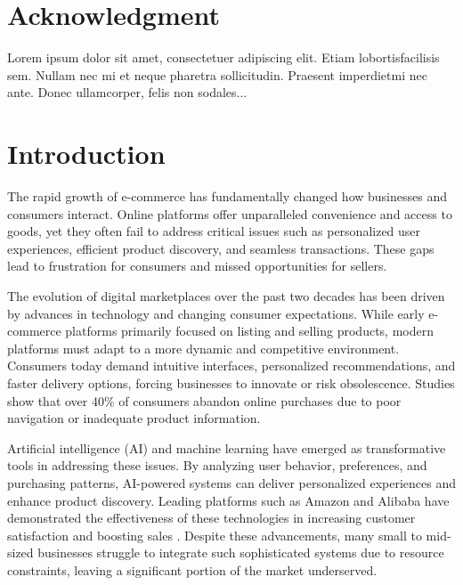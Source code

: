 \documentclass[12pt]{report}
\begin{document}

\chapter*{Acknowledgment}

Lorem  ipsum  dolor  sit  amet,  consectetuer  adipiscing
elit. Etiam  lobortisfacilisis sem.  Nullam nec mi et
neque pharetra sollicitudin.  Praesent imperdietmi nec ante.
Donec ullamcorper, felis non sodales...
\newpage

\tableofcontents

\listoffigures
{}

\listoftables
{}

\clearpage
{}

\newpage

\chapter{Introduction}
The rapid growth of e-commerce has fundamentally changed how businesses and consumers
interact. Online platforms offer unparalleled convenience and access to goods, yet they often
fail to address critical issues such as personalized user experiences, efficient product
discovery, and seamless transactions. These gaps lead to frustration for consumers and missed
opportunities for sellers.

The evolution of digital marketplaces over the past two decades has been driven by advances
in technology and changing consumer expectations. While early e-commerce platforms
primarily focused on listing and selling products, modern platforms must adapt to a more
dynamic and competitive environment. Consumers today demand intuitive interfaces,
personalized recommendations, and faster delivery options, forcing businesses to innovate or
risk obsolescence. Studies show that over 40\% of consumers abandon online purchases due to
poor navigation or inadequate product information.\cite{c1}\cite{c2}

Artificial intelligence (AI) and machine learning have emerged as transformative tools in
addressing these issues. By analyzing user behavior, preferences, and purchasing patterns,
AI-powered systems can deliver personalized experiences and enhance product discovery.
Leading platforms such as Amazon and Alibaba have demonstrated the effectiveness of these
technologies in increasing customer satisfaction and boosting sales \cite{c2}\cite{c3}. Despite these
advancements, many small to mid-sized businesses struggle to integrate such sophisticated
systems due to resource constraints, leaving a significant portion of the market underserved.
\cite{c3}
\end{document}
